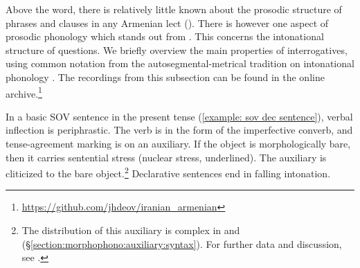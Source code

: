 Above the word, there is relatively little known about the prosodic structure of phrases and clauses in any Armenian lect (\cites[27ff]{Fairbanks-1948-PhonologyMorphoWestern}[14ff]{Johnson-1954-EastArmGrammar}{Ghukasyan-1990-WesternEasternArmenianIntonation}{ToparlakDolatian-202x-IntonationFocusMarkingWesternArmenian}{Dolatian-2022-InterfaceNuclearStressWesternArmenianTurkishPersian}).  There is however one aspect of {\iaIA} prosodic phonology which stands out from {\seaSEA}. This concerns the intonational structure of questions.  We briefly overview the main properties of {\iaIA} interrogatives, using common notation from the autosegmental-metrical tradition on intonational phonology \citep{Pierrehumbert-1980-phonologyPhoneticsEnglishIntonation,Ladd-1986-IntonationalPhrasingRecursiveProsodic,jun-2007-prosodicTypologyPhonologyIntonationPhrasing}. The recordings from this subsection can be found in the online archive.\footnote{\url{https://github.com/jhdeov/iranian_armenian}}

In   a basic SOV sentence in the present tense (\ref{example: sov dec sentence}), verbal inflection is periphrastic. The verb is in the form of the imperfective converb, and tense-agreement marking is on an auxiliary.  If the object is morphologically bare, then it carries sentential stress (nuclear stress, underlined). The auxiliary is cliticized to the bare object.\footnote{The distribution of this auxiliary is complex in {\seaSE} and {\iaIA} (\S\ref{section:morphophono:auxiliary:syntax}). For further data and discussion, see \citet{Tamrazian-1994-ArmenianSyntax,Megerdoomian-2009-ThesisBook,KahnemuyipourMegerdoomian-2011-secondcliticvP,KahnemuyipourMegerdoomian-2017-positionalDistriutionFocus}.} Declarative sentences end in falling intonation.\largerpage[2]




